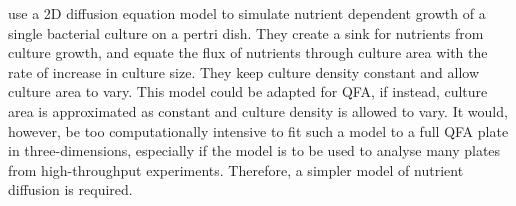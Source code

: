 \citet{Reo2014} use a 2D diffusion equation model to simulate nutrient
dependent growth of a single bacterial culture on a pertri dish. They
create a sink for nutrients from culture growth, and equate the flux
of nutrients through culture area with the rate of increase in culture
size. They keep culture density constant and allow culture area to
vary. This model could be adapted for QFA, if instead, culture area is
approximated as constant and culture density is allowed to vary. It
would, however, be too computationally intensive to fit such a model
to a full QFA plate in three-dimensions, especially if the model is to
be used to analyse many plates from high-throughput
experiments. Therefore, a simpler model of nutrient diffusion is
required.

